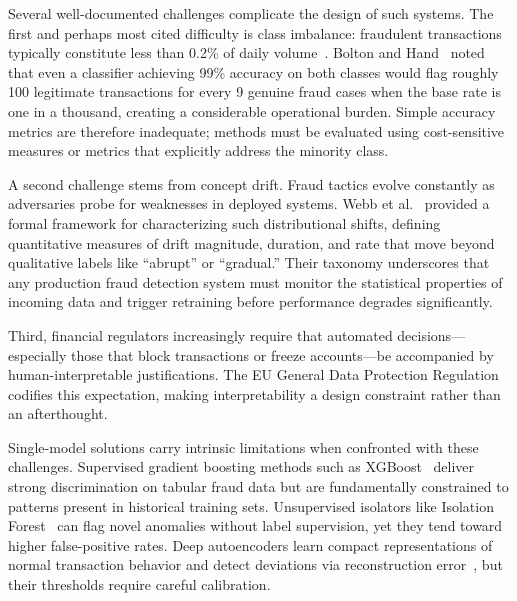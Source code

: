 \documentclass[conference,10pt]{IEEEtran}
\begin{document}
Several well-documented challenges complicate the design of such systems. The first and perhaps most cited difficulty is class imbalance: fraudulent transactions typically constitute less than 0.2\% of daily volume~\cite{dal2014learned,bolton2002statistical}. Bolton and Hand~\cite{bolton2002statistical} noted that even a classifier achieving 99\% accuracy on both classes would flag roughly 100 legitimate transactions for every 9 genuine fraud cases when the base rate is one in a thousand, creating a considerable operational burden. Simple accuracy metrics are therefore inadequate; methods must be evaluated using cost-sensitive measures or metrics that explicitly address the minority class.

A second challenge stems from concept drift. Fraud tactics evolve constantly as adversaries probe for weaknesses in deployed systems. Webb et al.~\cite{webb2016characterizing} provided a formal framework for characterizing such distributional shifts, defining quantitative measures of drift magnitude, duration, and rate that move beyond qualitative labels like ``abrupt'' or ``gradual.'' Their taxonomy underscores that any production fraud detection system must monitor the statistical properties of incoming data and trigger retraining before performance degrades significantly.

Third, financial regulators increasingly require that automated decisions---especially those that block transactions or freeze accounts---be accompanied by human-interpretable justifications. The EU General Data Protection Regulation~\cite{eu2016gdpr} codifies this expectation, making interpretability a design constraint rather than an afterthought.

Single-model solutions carry intrinsic limitations when confronted with these challenges. Supervised gradient boosting methods such as XGBoost~\cite{chen2016xgboost} deliver strong discrimination on tabular fraud data but are fundamentally constrained to patterns present in historical training sets. Unsupervised isolators like Isolation Forest~\cite{liu2008isolation} can flag novel anomalies without label supervision, yet they tend toward higher false-positive rates. Deep autoencoders learn compact representations of normal transaction behavior and detect deviations via reconstruction error~\cite{an2015variational}, but their thresholds require careful calibration.
\end{document}
